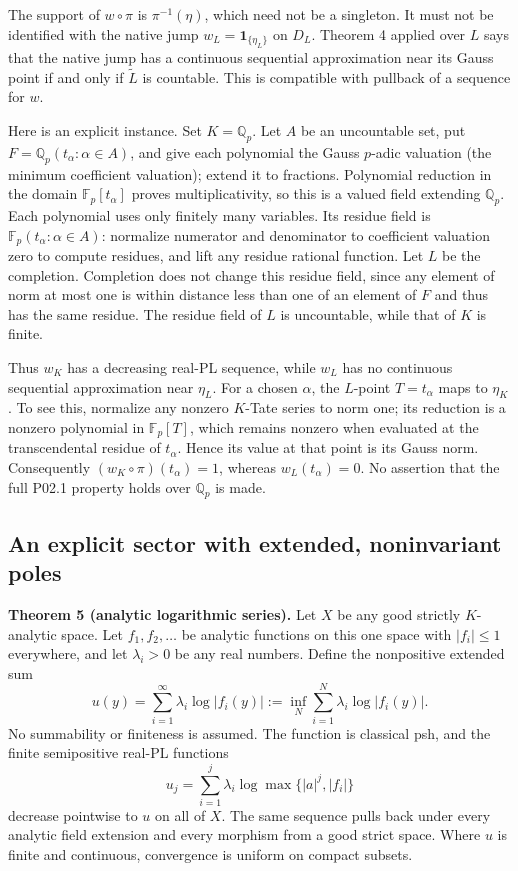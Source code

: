 \documentclass[
  11pt,
]{article}
\begin{document}
The support of \(w\circ\pi\) is \(\pi^{-1}(\eta)\), which need not be a
singleton. It must not be identified with the native jump
\(w_L=\mathbf1_{\{\eta_L\}}\) on \(D_L\). Theorem 4 applied over \(L\)
says that the native jump has a continuous sequential approximation near
its Gauss point if and only if \(\widetilde L\) is countable. This is
compatible with pullback of a sequence for \(w\).

Here is an explicit instance. Set \(K=\mathbb Q_p\). Let \(A\) be an
uncountable set, put \(F=\mathbb Q_p(t_\alpha:\alpha\in A)\), and give
each polynomial the Gauss \(p\)-adic valuation (the minimum coefficient
valuation); extend it to fractions. Polynomial reduction in the domain
\(\mathbb F_p[t_\alpha]\) proves multiplicativity, so this is a valued
field extending \(\mathbb Q_p\). Each polynomial uses only finitely many
variables. Its residue field is \(\mathbb F_p(t_\alpha:\alpha\in A)\):
normalize numerator and denominator to coefficient valuation zero to
compute residues, and lift any residue rational function. Let \(L\) be
the completion. Completion does not change this residue field, since any
element of norm at most one is within distance less than one of an
element of \(F\) and thus has the same residue. The residue field of
\(L\) is uncountable, while that of \(K\) is finite.

Thus \(w_K\) has a decreasing real-PL sequence, while \(w_L\) has no
continuous sequential approximation near \(\eta_L\). For a chosen
\(\alpha\), the \(L\)-point \(T=t_\alpha\) maps to \(\eta_K\). To see
this, normalize any nonzero \(K\)-Tate series to norm one; its reduction
is a nonzero polynomial in \(\mathbb F_p[T]\), which remains nonzero
when evaluated at the transcendental residue of \(t_\alpha\). Hence its
value at that point is its Gauss norm. Consequently
\((w_K\circ\pi)(t_\alpha)=1\), whereas \(w_L(t_\alpha)=0\). No assertion
that the full P02.1 property holds over \(\mathbb Q_p\) is made.

\subsection{An explicit sector with extended, noninvariant
poles}\label{an-explicit-sector-with-extended-noninvariant-poles}

\textbf{Theorem 5 (analytic logarithmic series).} Let \(X\) be any good
strictly \(K\)-analytic space. Let \(f_1,f_2,\ldots\) be analytic
functions on this one space with \(|f_i|\le1\) everywhere, and let
\(\lambda_i>0\) be any real numbers. Define the nonpositive extended sum
\[u(y)=\sum_{i=1}^\infty\lambda_i\log|f_i(y)|
:=\inf_N\sum_{i=1}^N\lambda_i\log|f_i(y)|.\] No summability or
finiteness is assumed. The function is classical psh, and the finite
semipositive real-PL functions
\[u_j=\sum_{i=1}^j\lambda_i\log\max\{|a|^j,|f_i|\}\] decrease pointwise
to \(u\) on all of \(X\). The same sequence pulls back under every
analytic field extension and every morphism from a good strict space.
Where \(u\) is finite and continuous, convergence is uniform on compact
subsets.
\end{document}
